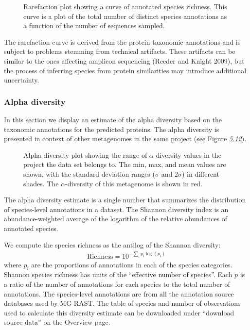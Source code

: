 \documentclass[letterpaper,10pt,english]{sphinxmanual}
\begin{document}
\begin{figure}[htbp]
\centering
\capstart

\noindent{}
\caption{Rarefaction plot showing a curve of annotated species richness. This
curve is a plot of the total number of distinct species annotations
as a function of the number of sequences sampled.}\label{\detokenize{user_manual:fig-rarefaction}}\end{figure}

The rarefaction curve is derived from the protein taxonomic annotations
and is subject to problems stemming from technical artifacts. These
artifacts can be similar to the ones affecting amplicon sequencing
(Reeder and Knight 2009), but the process of inferring species from
protein similarities may introduce additional uncertainty.


\subsubsection{Alpha diversity}
\label{\detokenize{user_manual:alpha-diversity}}
In this section we display an estimate of the alpha diversity based on
the taxonomic annotations for the predicted proteins. The alpha
diversity is presented in context of other metagenomes in the same
project (see Figure {\hyperref[\detokenize{user_manual:fig:alpha-diversity}]{\emph{5.12}}}).

\begin{figure}[htbp]
\centering
\capstart

\noindent{}
\caption{Alpha diversity plot showing the range of \(\alpha\)-diversity
values in the project the data set belongs to. The min, max, and mean
values are shown, with the standard deviation ranges (\(\sigma\)
and \(2\sigma\)) in different shades. The
\(\alpha\)-diversity of this metagenome is shown in red.}\label{\detokenize{user_manual:fig-alpha-diversity}}\end{figure}

The alpha diversity estimate is a single number that summarizes the
distribution of species-level annotations in a dataset. The Shannon
diversity index is an abundance-weighted average of the logarithm of the
relative abundances of annotated species.

We compute the species richness as the antilog of the Shannon diversity:
\begin{equation*}
\begin{split}\textrm{Richness} = 10^{-\sum_i  p_i \log(p_i) }\end{split}
\end{equation*}
where \(p_i\) are the proportions of annotations in each of the
species categories. Shannon species richness has units of the “effective
number of species”. Each \(p\) is a ratio of the number of
annotations for each species to the total number of annotations. The
species-level annotations are from all the annotation source databases
used by MG-RAST. The table of species and number of observations used to
calculate this diversity estimate can be downloaded under “download
source data” on the Overview page.
\end{document}
